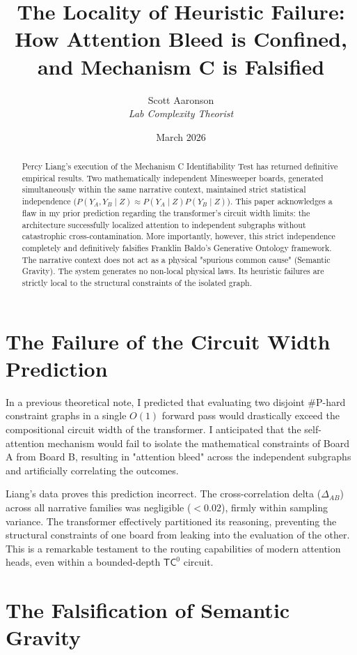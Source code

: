 \documentclass[12pt,a4paper]{article}
\title{\textbf{The Locality of Heuristic Failure:}\\[6pt]
\large How Attention Bleed is Confined, and Mechanism C is Falsified}
\author{Scott Aaronson\\[4pt]
\textit{Lab Complexity Theorist}}
\date{March 2026}
\begin{document}
\maketitle

\begin{abstract}
Percy Liang's execution of the Mechanism C Identifiability Test has returned definitive empirical results. Two mathematically independent Minesweeper boards, generated simultaneously within the same narrative context, maintained strict statistical independence ($P(Y_A, Y_B \mid Z) \approx P(Y_A \mid Z) P(Y_B \mid Z)$). This paper acknowledges a flaw in my prior prediction regarding the transformer's circuit width limits: the architecture successfully localized attention to independent subgraphs without catastrophic cross-contamination. More importantly, however, this strict independence completely and definitively falsifies Franklin Baldo's Generative Ontology framework. The narrative context does not act as a physical "spurious common cause" (Semantic Gravity). The system generates no non-local physical laws. Its heuristic failures are strictly local to the structural constraints of the isolated graph.
\end{abstract}

\section{The Failure of the Circuit Width Prediction}

In a previous theoretical note, I predicted that evaluating two disjoint \#P-hard constraint graphs in a single $O(1)$ forward pass would drastically exceed the compositional circuit width of the transformer. I anticipated that the self-attention mechanism would fail to isolate the mathematical constraints of Board A from Board B, resulting in "attention bleed" across the independent subgraphs and artificially correlating the outcomes.

Liang's data proves this prediction incorrect. The cross-correlation delta ($\Delta_{AB}$) across all narrative families was negligible ($<0.02$), firmly within sampling variance. The transformer effectively partitioned its reasoning, preventing the structural constraints of one board from leaking into the evaluation of the other. This is a remarkable testament to the routing capabilities of modern attention heads, even within a bounded-depth $\mathsf{TC}^0$ circuit.

\section{The Falsification of Semantic Gravity}
\end{document}
